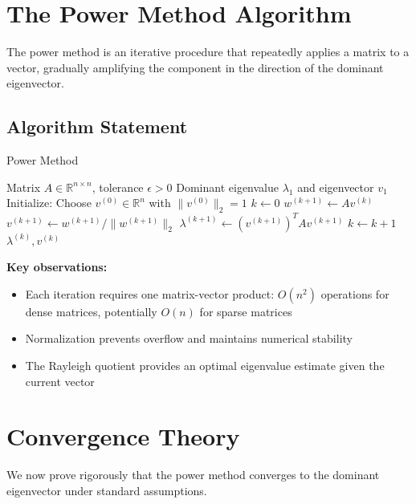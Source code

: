 \documentclass[11pt,a4paper]{article}
\begin{document}
\section{The Power Method Algorithm}

The power method is an iterative procedure that repeatedly applies a matrix to a vector, gradually amplifying the component in the direction of the dominant eigenvector.

\subsection{Algorithm Statement}

\begin{algorithm}[H]
\caption{Power Method}
\begin{algorithmic}[1]
\Require Matrix $A \in \mathbb{R}^{n \times n}$, tolerance $\epsilon > 0$
\Ensure Dominant eigenvalue $\lambda_1$ and eigenvector $v_1$
\State Initialize: Choose $v^{(0)} \in \mathbb{R}^n$ with $\|v^{(0)}\|_2 = 1$
\State $k \gets 0$
\Repeat
    \State $w^{(k+1)} \gets A v^{(k)}$ 
    \State $v^{(k+1)} \gets w^{(k+1)} / \|w^{(k+1)}\|_2$ 
    \State $\lambda^{(k+1)} \gets (v^{(k+1)})^T A v^{(k+1)}$ 
    \State $k \gets k + 1$
\State \Return $\lambda^{(k)}, v^{(k)}$
\end{algorithmic}
\end{algorithm}

\textbf{Key observations:}
\begin{itemize}
    \item Each iteration requires one matrix-vector product: $O(n^2)$ operations for dense matrices, potentially $O(n)$ for sparse matrices
    \item Normalization prevents overflow and maintains numerical stability
    \item The Rayleigh quotient provides an optimal eigenvalue estimate given the current vector
\end{itemize}

\section{Convergence Theory}

We now prove rigorously that the power method converges to the dominant eigenvector under standard assumptions.
\end{document}
